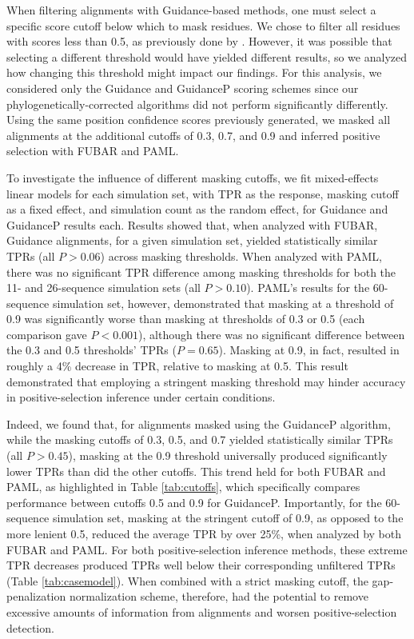 \documentclass[11pt]{article}
\begin{document}
When filtering alignments with Guidance-based methods, one must select a specific score cutoff below which to mask residues. We chose to filter all residues with scores less than 0.5, as previously done by \citet{Jordan2012}. However, it was possible that selecting a different threshold would have yielded different results, so we analyzed how changing this threshold might impact our findings. For this analysis, we considered only the Guidance and GuidanceP scoring schemes since our phylogenetically-corrected algorithms did not perform significantly differently. Using the same position confidence scores previously generated, we masked all alignments at the additional cutoffs of 0.3, 0.7, and 0.9 and inferred positive selection with FUBAR and PAML.

To investigate the influence of different masking cutoffs, we fit mixed-effects linear models for each simulation set, with TPR as the response, masking cutoff as a fixed effect, and simulation count as the random effect, for Guidance and GuidanceP results each. 
Results showed that, when analyzed with FUBAR, Guidance alignments, for a given simulation set, yielded statistically similar TPRs (all $P>0.06$) across masking thresholds. When analyzed with PAML, there was no significant TPR difference among masking thresholds for both the 11- and 26-sequence simulation sets (all $P>0.10$). PAML's results for the 60-sequence simulation set, however, demonstrated that masking at a threshold of 0.9 was significantly worse than masking at thresholds of 0.3 or 0.5 (each comparison gave $P<0.001$), although there was no significant difference between the 0.3 and 0.5 thresholds' TPRs ($P=0.65$). Masking at 0.9, in fact, resulted in roughly a 4\% decrease in TPR, relative to masking at 0.5. This result demonstrated that employing a stringent masking threshold may hinder accuracy in positive-selection inference under certain conditions.

Indeed, we found that, for alignments masked using the GuidanceP algorithm, while the masking cutoffs of 0.3, 0.5, and 0.7 yielded statistically similar TPRs (all $P>0.45$), masking at the 0.9 threshold universally produced significantly lower TPRs than did the other cutoffs. This trend held for both FUBAR and PAML, as highlighted in Table \ref{tab:cutoffs}, which specifically compares performance between cutoffs 0.5 and 0.9 for GuidanceP. Importantly, for the 60-sequence simulation set, masking at the stringent cutoff of 0.9, as opposed to the more lenient 0.5, reduced the average TPR by over 25\%, when analyzed by both FUBAR and PAML. For both positive-selection inference methods, these extreme TPR decreases produced TPRs well below their corresponding unfiltered TPRs (Table \ref{tab:casemodel}). When combined with a strict masking cutoff, the gap-penalization normalization scheme, therefore, had the potential to remove excessive amounts of information from alignments and worsen positive-selection detection. 
\end{document}
